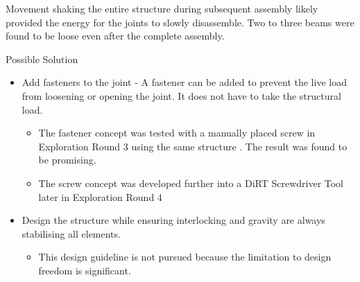 Movement shaking the entire structure during subsequent assembly likely provided the energy for the joints to slowly disassemble. Two to three beams were found to be loose even after the complete assembly. 

Possible Solution
\begin{itemize}
    \item Add fasteners to the joint - A fastener can be added to prevent the live load from loosening or opening the joint. It does not have to take the structural load.
    \begin{itemize}
        \item The fastener concept was tested with a manually placed screw in Exploration Round 3 using the same structure . The result was found to be promising.
        \item The screw concept was developed further into a DiRT Screwdriver Tool later in Exploration Round 4 
    \end{itemize}
    \item Design the structure while ensuring interlocking and gravity are always stabilising all elements. 
    \begin{itemize}
        \item This design guideline is not pursued because the limitation to design freedom is significant. 
    \end{itemize}
\end{itemize}
